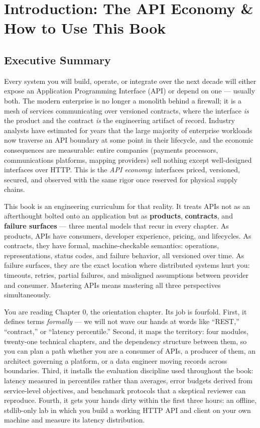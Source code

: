 \chapter{Introduction: The API Economy \& How to Use This Book}
\label{ch:introduction}

\section*{Executive Summary}

Every system you will build, operate, or integrate over the next decade will
either expose an Application Programming Interface (API) or depend on one ---
usually both. The modern enterprise is no longer a monolith behind a firewall;
it is a mesh of services communicating over versioned contracts, where the
interface \emph{is} the product and the contract \emph{is} the engineering
artifact of record. Industry analysts have estimated for years that the large
majority of enterprise workloads now traverse an API boundary at some point in
their lifecycle, and the economic consequences are measurable: entire
companies (payments processors, communications platforms, mapping providers)
sell nothing except well-designed interfaces over HTTP. This is the
\emph{API economy}: interfaces priced, versioned, secured, and observed with
the same rigor once reserved for physical supply chains.

This book is an engineering curriculum for that reality. It treats APIs not
as an afterthought bolted onto an application but as \textbf{products},
\textbf{contracts}, and \textbf{failure surfaces} --- three mental models
that recur in every chapter. As products, APIs have consumers, developer
experience, pricing, and lifecycles. As contracts, they have formal,
machine-checkable semantics: operations, representations, status codes, and
failure behavior, all versioned over time. As failure surfaces, they are the
exact location where distributed systems hurt you: timeouts, retries, partial
failures, and misaligned assumptions between provider and consumer. Mastering
APIs means mastering all three perspectives simultaneously.

You are reading Chapter 0, the orientation chapter. Its job is fourfold.
First, it defines terms \emph{formally} --- we will not wave our hands at
words like ``REST,'' ``contract,'' or ``latency percentile.'' Second, it maps
the territory: four modules, twenty-one technical chapters, and the
dependency structure between them, so you can plan a path whether you are a
consumer of APIs, a producer of them, an architect governing a platform, or a
data engineer moving records across boundaries. Third, it installs the
evaluation discipline used throughout the book: latency measured in
percentiles rather than averages, error budgets derived from service-level
objectives, and benchmark protocols that a skeptical reviewer can reproduce.
Fourth, it gets your hands dirty within the first three hours: an offline,
stdlib-only lab in which you build a working HTTP API and client on your own
machine and measure its latency distribution.

